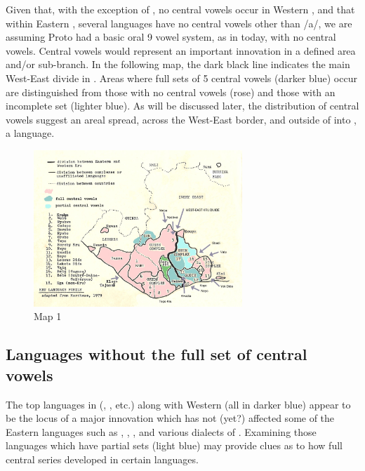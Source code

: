 \documentclass[output=paper,newtxmath,modfonts,nonflat,draft]{langsci/langscibook}
\begin{document}
Given that, with the exception of , no central vowels occur in Western , and that within Eastern , several languages have no central vowels other than /a/, we are assuming Proto  had a basic oral 9 vowel system, as in  today, with no central vowels.  Central vowels would represent an important innovation in a defined area and/or sub-branch.  In the following map, the dark black line indicates the main West-East divide in .  Areas where full sets of 5 central vowels (darker blue) occur are distinguished from those with no central vowels (rose) and those with an incomplete set (lighter blue). As will be discussed later, the distribution of central vowels suggest an areal spread, across the West-East border, and outside of  into , a  language.


\begin{figure}
\includegraphics[width=0.7\textwidth]{figures/fig-zogbo-1.png}
\caption{Map 1}
\label{fig:zogbo:1}
\end{figure} 

\subsection{Languages without the full set of central vowels}\label{sec:zogbo:2.2} 

The top languages in  (,  , etc.) along with Western  (all in darker blue) appear to be the locus of a major innovation which has not (yet?) affected some of the Eastern languages such as , , , and various dialects of . Examining those languages which have partial sets (light blue) may provide clues as to how full central series developed in certain languages. 
\end{document}
